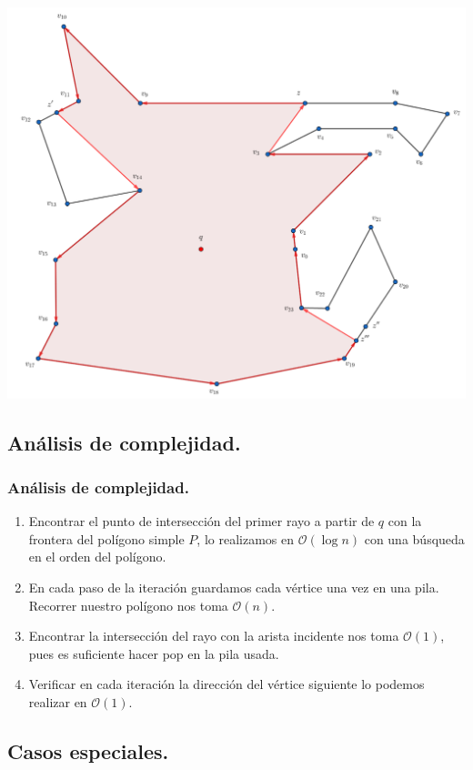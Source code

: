 \begin{frame}
  \centering \includegraphics[width=0.70 \paperwidth]{images/Ejecucion/e42.png}
\end{frame}

\subsection{Análisis de complejidad.}

\begin{frame}
  \frametitle{Análisis de complejidad.}
  \begin{enumerate}
  \item Encontrar el punto de intersección del primer rayo a partir de $q$ con la
    frontera del polígono simple $P$, lo realizamos en $\mathcal{O}(\log n)$ con una
    búsqueda en el orden del polígono.
  \item En cada paso de la iteración guardamos cada vértice una vez en una pila. Recorrer nuestro
    polígono nos toma $\mathcal{O}(n)$.
  \item Encontrar la intersección del rayo con la arista incidente nos toma $\mathcal{O}(1)$, pues
    es suficiente hacer pop en la pila usada.
  \item Verificar en cada iteración la dirección del vértice siguiente lo podemos realizar en $\mathcal{O}(1)$.
  \end{enumerate}
\end{frame}

\subsection{Casos especiales.}

